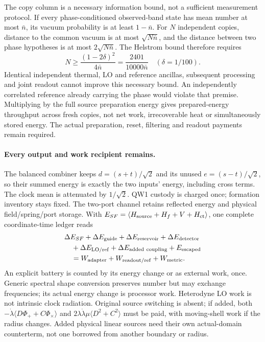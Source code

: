 \documentclass[10pt,twocolumn,letterpaper]{article}
\begin{document}
The copy column is a necessary information bound, not a sufficient
measurement protocol. If every phase-conditioned observed-band state has
mean number at most $\bar n$, its vacuum probability is at least
$1-\bar n$. For $N$ independent copies, distance to the common vacuum is
at most $\sqrt{N\bar n}$, and the distance between two phase hypotheses
is at most $2\sqrt{N\bar n}$. The Helstrom bound therefore requires
\begin{equation}
 N\ge\frac{(1-2\delta)^2}{4\bar n}
      =\frac{2401}{10000\bar n}\quad(\delta=1/100).
\end{equation}
Identical independent thermal, LO and reference ancillas, subsequent
processing and joint readout cannot improve this necessary bound.
An independently correlated reference already carrying the phase would
violate that premise. Multiplying by the full source preparation energy
gives prepared-energy throughput across fresh copies, not net work,
irrecoverable heat or simultaneously stored energy. The actual preparation,
reset, filtering and readout payments remain required.

\paragraph{Every output and work recipient remains.}
The balanced combiner keeps $d=(s+t)/\sqrt2$ and its unused
$e=(s-t)/\sqrt2$, so their summed energy is exactly the two inputs'
energy, including cross terms. The clock mean is attenuated by
$1/\sqrt2$. QW1 custody is charged once; formation inventory stays fixed.
The two-port channel retains reflected energy and physical field/spring/port
storage. With $E_{SF}=\langle H_{\rm source}+H_f+V+H_{\rm ct}\rangle$,
one complete coordinate-time ledger reads
\begin{equation}
 \begin{split}
 &\Delta E_{SF}+\Delta E_{\rm guide}+\Delta E_{\rm reservoir}
       +\Delta E_{\rm detector}\\
 &\quad+\Delta E_{\rm LO/ref}+\Delta E_{\rm added\ coupling}
       +E_{\rm escaped}\\
 &\hspace{1em}=W_{\rm adapter}+W_{\rm readout/ref}+W_{\rm metric}.
 \end{split}
\end{equation}
An explicit battery is counted by its energy change or as external work,
once. Generic spectral shape conversion preserves number but may exchange
frequencies; its actual energy change is processor work. Heterodyne LO work
is not intrinsic clock radiation. Original source switching is absent;
if added, both $-\dot\lambda\langle D\Phi_++C\Phi_\times\rangle$ and
$2\lambda\dot\lambda\mu\langle D^2+C^2\rangle$ must be paid, with
moving-shell work if the radius changes. Added physical linear sources
need their own actual-domain counterterm, not one borrowed from another
boundary or radius.
\end{document}
